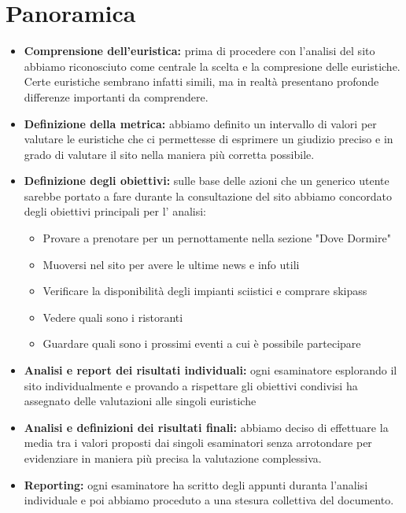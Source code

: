     \section{Panoramica}
    \begin{itemize}
        \item \textbf{Comprensione dell'euristica: }prima di procedere con
        l'analisi del sito abbiamo riconosciuto come centrale la scelta e la
        compresione delle euristiche. Certe euristiche sembrano infatti simili,
        ma in realtà presentano profonde differenze importanti da comprendere.
        \item \textbf{Definizione della metrica: }abbiamo definito un
        intervallo di valori per valutare le euristiche che ci permettesse di
        esprimere un giudizio preciso e in grado di valutare il sito nella
        maniera più corretta possibile.
        \item \textbf{Definizione degli obiettivi: }sulle base delle azioni che
        un generico utente sarebbe portato a fare durante la consultazione del
        sito abbiamo concordato degli obiettivi principali per l' analisi:
        \begin{itemize}
            \item Provare a prenotare per un pernottamente nella sezione "Dove Dormire"
            \item Muoversi nel sito per avere le ultime news e info utili
            \item Verificare la disponibilità degli impianti sciistici e comprare skipass
            \item Vedere quali sono i ristoranti
            \item Guardare quali sono i prossimi eventi a cui è possibile partecipare
        \end{itemize}
        \item \textbf{Analisi e report dei risultati individuali: }ogni
        esaminatore esplorando il sito individualmente e provando a rispettare
        gli obiettivi condivisi ha assegnato delle valutazioni alle singoli
        euristiche
        \item \textbf{Analisi e definizioni dei risultati finali: }abbiamo
        deciso di effettuare la media tra i valori proposti dai singoli
        esaminatori senza arrotondare per evidenziare in maniera più precisa la
        valutazione complessiva.
        \item \textbf{Reporting: }ogni esaminatore ha scritto degli appunti
        duranta l'analisi individuale e poi abbiamo proceduto a una stesura
        collettiva del documento.
    \end{itemize}
